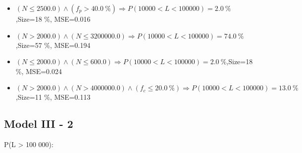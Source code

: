 \documentclass[numbered]{CSL}
\begin{document}
\begin{itemize}
\item $(N \leq 2500.0) \land (f_p > 40.0~\%) \Rightarrow P(10 000 < L < 100 000) = 2.0~\%$,\hfill Size=18 \%, MSE=0.016
\item $(N > 2000.0) \land (N \leq 3200000.0) \Rightarrow P(10 000 < L < 100 000) = 74.0~\%$,\hfill Size=57 \%, MSE=0.194
\item $(N \leq 2000.0) \land (N \leq 600.0) \Rightarrow P(10 000 < L < 100 000) = 2.0~\%$,\hfill Size=18 \%, MSE=0.024
\item $(N > 2000.0) \land (N > 4000000.0) \land (f_c \leq 20.0~\%) \Rightarrow P(10 000 < L < 100 000) = 13.0~\%$,\hfill Size=11 \%, MSE=0.113
\end{itemize}

\subsection{Model III - 2}
P(L > 100 000):
\end{document}
